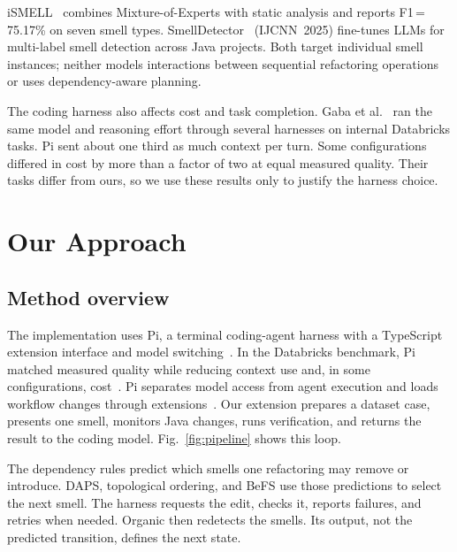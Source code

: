 \documentclass[conference]{IEEEtran}
\begin{document}
iSMELL~\cite{10.1145/3691620.3695508} combines Mixture-of-Experts with static
analysis and reports F1\,=\,75.17\% on seven smell types.
SmellDetector~\cite{liang2025smelldetector} (IJCNN~2025) fine-tunes LLMs for
multi-label smell detection across Java projects.
Both target individual smell instances; neither models interactions between
sequential refactoring operations or uses dependency-aware planning.

The coding harness also affects cost and task completion. Gaba et
al.~\cite{gaba2026databricks} ran the same model and reasoning effort through
several harnesses on internal Databricks tasks. Pi sent about one third as much
context per turn. Some configurations differed in cost by more than a factor of
two at equal measured quality. Their tasks differ from ours, so we use these
results only to justify the harness choice.

\section{Our Approach}

\subsection{Method overview}

The implementation uses Pi, a terminal coding-agent harness with a TypeScript
extension interface and model switching~\cite{pi2026}. In the Databricks
benchmark, Pi matched measured quality while reducing context use and, in some
configurations, cost~\cite{gaba2026databricks}.
Pi separates model access from agent execution and loads workflow changes
through extensions~\cite{pi2026}. Our extension prepares a dataset case,
presents one smell, monitors Java changes, runs verification, and returns the
result to the coding model. Fig.~\ref{fig:pipeline} shows this loop.

The dependency rules predict which smells one refactoring may remove or
introduce. DAPS, topological ordering, and BeFS use those predictions to select
the next smell. The harness requests the edit, checks it, reports failures, and
retries when needed. Organic then redetects the smells. Its output, not the
predicted transition, defines the next state.
\end{document}
